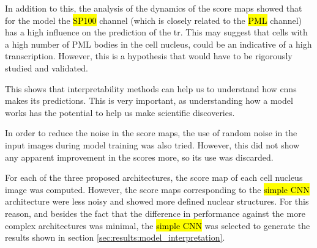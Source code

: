 In addition to this, the analysis of the dynamics of the score maps showed that for the model the \hl{SP100} channel (which is closely related to the \hl{PML} channel) has a high influence on the prediction of the \gls{tr}. This may suggest that cells with a high number of PML bodies in the cell nucleus, could be an indicative of a high transcription. However, this is a hypothesis that would have to be rigorously studied and validated.

This shows that interpretability methods can help us to understand how \glspl{cnn} makes its predictions. This is very important, as understanding how a model works has the potential to help us make scientific discoveries.

In order to reduce the noise in the score maps, the use of random noise in the input images during model training was also tried. However, this did not show any apparent improvement in the scores more, so its use was discarded.

For each of the three proposed architectures, the score map of each cell nucleus image was computed. However, the score maps corresponding to the \hl{simple CNN} architecture were less noisy and showed more defined nuclear structures. For this reason, and besides the fact that the difference in performance against the more complex architectures was minimal, the \hl{simple CNN} was selected to generate the results shown in section \ref{sec:results:model_interpretation}.
